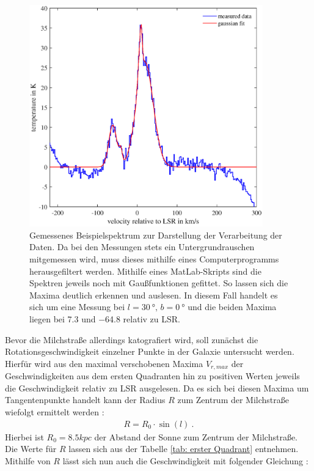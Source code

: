 \begin{figure}[H]
    \centering
    \includegraphics[width= 0.9\textwidth]{plots/TestBaseline.eps}
    \caption[Gemessenes Beispielspektrum zur Darstellung der Verarbeitung der Daten]{Gemessenes Beispielspektrum zur Darstellung der Verarbeitung der Daten. Da bei den Messungen stets ein Untergrundrauschen mitgemessen wird, muss dieses mithilfe eines Computerprogramms herausgefiltert werden. Mithilfe eines MatLab-Skripts sind die Spektren jeweils noch mit Gaußfunktionen gefittet. So lassen sich die Maxima deutlich erkennen und auslesen. In diesem Fall handelt es sich um eine Messung bei $l = \SI{30}{\degree}, \, b = \SI{0}{\degree}$ und die beiden Maxima liegen bei \SI{7.3}{} und \SI{-64.8}{} relativ zu LSR.}
    \label{fig:TestBaseline}
\end{figure}
Bevor die Milchstraße allerdings katografiert wird, soll zunächst die Rotationsgeschwindigkeit einzelner Punkte in der Galaxie untersucht werden. Hierfür wird aus den maximal verschobenen Maxima $V_{r,max}$ der Geschwindigkeiten aus dem ersten Quadranten hin zu positiven Werten jeweils die Geschwindigkeit relativ zu LSR ausgelesen. Da es sich bei diesen Maxima um Tangentenpunkte handelt kann der Radius $R$ zum Zentrum der Milchstraße wiefolgt ermittelt werden \cite{H1}:
\begin{align}
    R = R_0 \cdot \sin(l) \ .
    \label{eq:TangenteR}
\end{align}
Hierbei ist $R_0 = \si{8.5}{kpc}$ der Abstand der Sonne zum Zentrum der Milchstraße. Die Werte für $R$ lassen sich aus der Tabelle \ref{tab: erster Quadrant} entnehmen. Mithilfe von $R$ lässt sich nun auch die Geschwindigkeit mit folgender Gleichung \cite{H1}:
